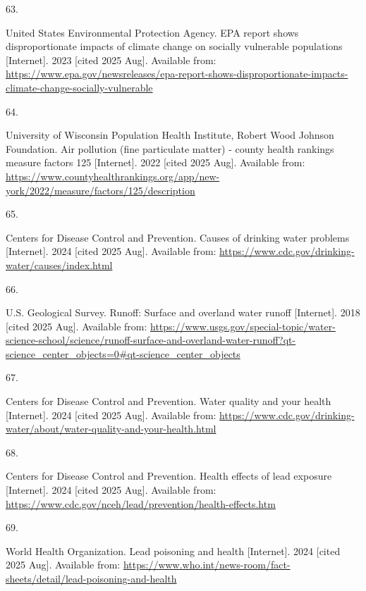 \documentclass[
  english,
  letterpaper,
]{report}
\newlength{\cslhangindent}
\newlength{\csllabelwidth}
\newenvironment{CSLReferences}[2] %
 {\begin{list}{}{%
  \setlength{\itemindent}{0pt}
  \setlength{\leftmargin}{0pt}
  \setlength{\parsep}{0pt}
  \ifodd #1
   \setlength{\leftmargin}{\cslhangindent}
   \setlength{\itemindent}{-1\cslhangindent}
  \fi
  \setlength{\itemsep}{#2\baselineskip}}}
 {\end{list}}
\newcommand{\CSLLeftMargin}[1]{\parbox[t]{\csllabelwidth}{\strut#1\strut}}
\newcommand{\CSLRightInline}[1]{\parbox[t]{\linewidth - \csllabelwidth}{\strut#1\strut}}
\begin{document}
\begin{CSLReferences}{0}{1}
\CSLLeftMargin{63. }%
\CSLRightInline{United States Environmental Protection Agency. EPA
report shows disproportionate impacts of climate change on socially
vulnerable populations {[}Internet{]}. 2023 {[}cited 2025 Aug{]}.
Available from:
\url{https://www.epa.gov/newsreleases/epa-report-shows-disproportionate-impacts-climate-change-socially-vulnerable}}

\CSLLeftMargin{64. }%
\CSLRightInline{University of Wisconsin Population Health Institute,
Robert Wood Johnson Foundation. Air pollution (fine particulate matter)
- county health rankings measure factors 125 {[}Internet{]}. 2022
{[}cited 2025 Aug{]}. Available from:
\url{https://www.countyhealthrankings.org/app/new-york/2022/measure/factors/125/description}}

\CSLLeftMargin{65. }%
\CSLRightInline{Centers for Disease Control and Prevention. Causes of
drinking water problems {[}Internet{]}. 2024 {[}cited 2025 Aug{]}.
Available from:
\url{https://www.cdc.gov/drinking-water/causes/index.html}}

\CSLLeftMargin{66. }%
\CSLRightInline{U.S. Geological Survey. Runoff: Surface and overland
water runoff {[}Internet{]}. 2018 {[}cited 2025 Aug{]}. Available from:
\url{https://www.usgs.gov/special-topic/water-science-school/science/runoff-surface-and-overland-water-runoff?qt-science_center_objects=0\#qt-science_center_objects}}

\CSLLeftMargin{67. }%
\CSLRightInline{Centers for Disease Control and Prevention. Water
quality and your health {[}Internet{]}. 2024 {[}cited 2025 Aug{]}.
Available from:
\url{https://www.cdc.gov/drinking-water/about/water-quality-and-your-health.html}}

\CSLLeftMargin{68. }%
\CSLRightInline{Centers for Disease Control and Prevention. Health
effects of lead exposure {[}Internet{]}. 2024 {[}cited 2025 Aug{]}.
Available from:
\url{https://www.cdc.gov/nceh/lead/prevention/health-effects.htm}}

\CSLLeftMargin{69. }%
\CSLRightInline{World Health Organization. Lead poisoning and health
{[}Internet{]}. 2024 {[}cited 2025 Aug{]}. Available from:
\url{https://www.who.int/news-room/fact-sheets/detail/lead-poisoning-and-health}}


\end{CSLReferences}
\end{document}
